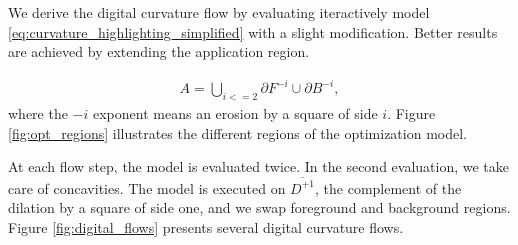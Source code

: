 \documentclass[runningheads]{llncs}
\begin{document}
We derive the digital curvature flow by evaluating iteractively model \eqref{eq:curvature_highlighting_simplified} with a slight modification. Better results are achieved by extending the application region. 

\begin{align*}
	A = \bigcup_{i<=2}{ \partial F^{-i} \cup \partial B^{-i} },
\end{align*}
where the $-i$ exponent means an erosion by a square of side $i$. Figure \ref{fig:opt_regions} illustrates the different regions of the optimization model. 

At each flow step, the model is evaluated twice. In the second evaluation, we take care of concavities. The model is executed on $\overline{D^{+1}}$, the complement of the dilation by a square of side one, and we swap foreground and background regions. Figure \ref{fig:digital_flows} presents several digital curvature flows.
\end{document}
